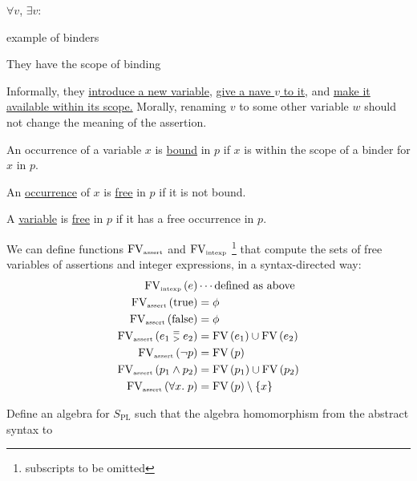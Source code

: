 \begin{enumcirc}
	\item
	$\forall v$, $\exists v$:
	\begin{enumrm}
		\item
		example of binders
		\item
		They have the scope of binding
		\item
		Informally, they
		\ul{introduce a new variable},
		\ul{give a nave $v$ to it}, and
		\ul{make it available within its scope.}
		Morally, renaming $v$ to some other variable $w$ should not change the meaning
		of the assertion.
	\end{enumrm}
	\item
	An occurrence of a variable $x$ is \ul{bound} in $p$ if $x$ is within the scope
	of a binder for $x$ in $p$.
	\item
	An \underline{occurrence} of $x$ is \underline{free} in $p$ if it is not bound.
	\item
	A \underline{variable} is \underline{free} in $p$ if it has a free occurrence
	in $p$.
	\item
	We can define functions $\textrm{FV}_{\textrm{\tiny assert}}$ and
	$\textrm{FV}_{\textrm{\tiny intexp}}$ \footnote{ subscripts to be omitted }
	that compute the sets of free variables of assertions and integer expressions,
	in a syntax-directed way:
	\begin{align*}
		\textrm{FV}_{\textrm{\tiny intexp}}\left(  e  \right)                           & \cdots                     \textrm{defined as above} \\
		\textrm{FV}_{\textrm{\tiny assert}}\left(  \textrm{true}  \right)                       & = \phi                                               \\
		\textrm{FV}_{\textrm{\tiny assert}}\left(  \textrm{false}  \right)                      & = \phi                                               \\
		\textrm{FV}_{\textrm{\tiny assert}}\left(  e_1 \;\substack{=\\>}\; e_2  \right) & = \textrm{FV}\left( e_1 \right) \cup \textrm{FV}\left( e_2 \right) \\
		\textrm{FV}_{\textrm{\tiny assert}}\left(  \neg p  \right)                      & = \textrm{FV}\left( p \right)                               \\
		\textrm{FV}_{\textrm{\tiny assert}}\left(  p_1 \wedge p_2  \right)              & = \textrm{FV}\left( p_1 \right) \cup \textrm{FV}\left( p_2 \right) \\
		\textrm{FV}_{\textrm{\tiny assert}}\left(  \forall x .\; p  \right)             & = \textrm{FV}\left( p \right) \setminus \left\{ x \right\}
	\end{align*}
	\begin{exercisetab}
		Define an algebra for $S_{\textrm{PL}}$ such that the algebra homomorphism from the abstract syntax to

\end{exercisetab}
\end{enumcirc}
